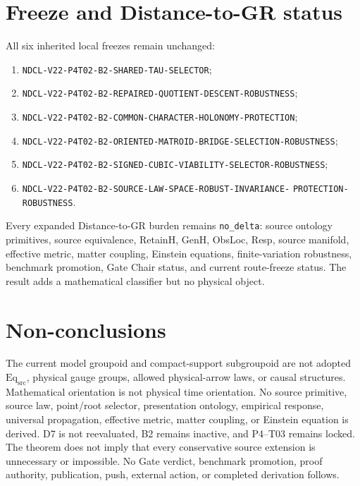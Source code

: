 \documentclass[11pt]{article}
\newcommand{\NoDelta}{\texttt{no\_delta}}
\begin{document}
\section{Freeze and Distance-to-GR status}

All six inherited local freezes remain unchanged:
\begin{enumerate}[leftmargin=2em]
  \item \texttt{NDCL-V22-P4T02-B2-SHARED-TAU-SELECTOR};
  \item \texttt{NDCL-V22-P4T02-B2-REPAIRED-QUOTIENT-DESCENT-ROBUSTNESS};
  \item \texttt{NDCL-V22-P4T02-B2-COMMON-CHARACTER-HOLONOMY-PROTECTION};
  \item \texttt{NDCL-V22-P4T02-B2-ORIENTED-MATROID-BRIDGE-SELECTION-ROBUSTNESS};
  \item \texttt{NDCL-V22-P4T02-B2-SIGNED-CUBIC-VIABILITY-SELECTOR-ROBUSTNESS};
  \item \texttt{NDCL-V22-P4T02-B2-SOURCE-LAW-SPACE-ROBUST-INVARIANCE-}
        \texttt{PROTECTION-ROBUSTNESS}.
\end{enumerate}

Every expanded Distance-to-GR burden remains \NoDelta{}: source ontology
primitives, source equivalence, RetainH, GenH, ObsLoc, Resp, source manifold,
effective metric, matter coupling, Einstein equations, finite-variation
robustness, benchmark promotion, Gate Chair status, and current route-freeze
status.  The result adds a mathematical classifier but no physical object.

\section{Non-conclusions}

The current model groupoid and compact-support subgroupoid are not adopted
\(\mathrm{Eq}_{\mathrm{src}}\), physical gauge groups, allowed physical-arrow
laws, or causal structures.  Mathematical orientation is not physical time
orientation.  No source primitive, source law, point/root selector,
presentation ontology, empirical response, universal propagation, effective
metric, matter coupling, or Einstein equation is derived.  D7 is not
reevaluated, B2 remains inactive, and P4--T03 remains locked.  The theorem does
not imply that every conservative source extension is unnecessary or
impossible.  No Gate verdict, benchmark promotion, proof authority,
publication, push, external action, or completed derivation follows.
\end{document}
